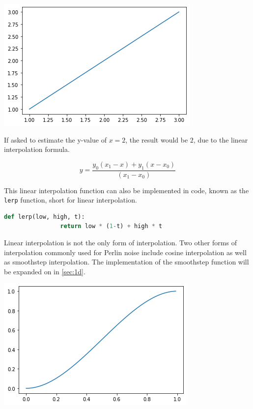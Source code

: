 \documentclass[10pt]{report}
\begin{document}
		\begin{minipage}{\textwidth}
			\centering
			\includegraphics[scale=.5]{linear-interpolation}
			\label{fig:linear-interpolation}
		\end{minipage}
	
		If asked to estimate the y-value of \(x = 2\), the result would be \(2\), due to the linear interpolation formula.
		
		\[y = \frac{y_0 (x_1 - x) + y_1 (x - x_0)}{(x_1 - x_0)}\]
		
		This linear interpolation function can also be implemented in code, known as the \lstinline|lerp| function, short for linear interpolation. 
		
		\begin{lstlisting}[label={lst:lerp}, language=Python, frame=none, caption={lerp function in Python.}, captionpos=b]
			def lerp(low, high, t):
				return low * (1-t) + high * t
		\end{lstlisting}
		
		Linear interpolation is not the only form of interpolation. Two other forms of interpolation commonly used for Perlin noise include cosine interpolation as well as smoothstep interpolation. The implementation of the smoothstep function will be expanded on in \ref{sec:1d}.
		
		\begin{minipage}{\textwidth}
			\centering
			\includegraphics[scale=.5]{smoothstep}
			\label{fig:smooth}
		\end{minipage}
		
\end{document}
